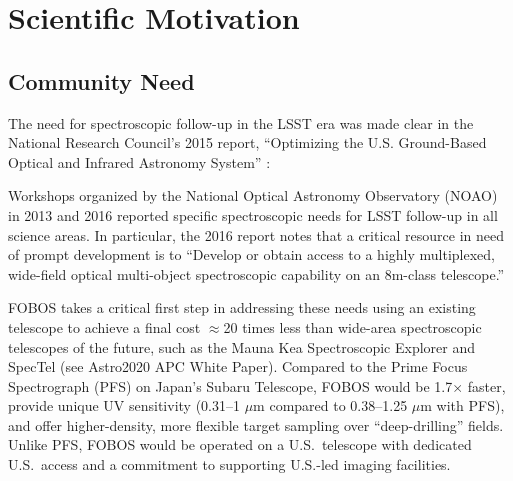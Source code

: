 
\vspace{-0.5cm}
\section{Scientific Motivation}

\subsection{Community Need} The need for spectroscopic follow-up in
the LSST era was made clear in the National Research Council's 2015
report, ``Optimizing the U.S. Ground-Based Optical and Infrared
Astronomy System'' \citep{NAP21722}:
%
\noindent{}

Workshops organized by the National Optical Astronomy Observatory
(NOAO) in 2013 and 2016 reported specific spectroscopic needs for
LSST follow-up in all science areas. In particular, the 2016 report
notes that a critical resource in need of prompt development is to
``Develop or obtain access to a highly multiplexed, wide-field
optical multi-object spectroscopic capability on an 8m-class
telescope.''

FOBOS takes a critical first step in addressing these needs using an
existing telescope to achieve a final cost $\approx$20 times less
than wide-area spectroscopic telescopes of the future, such as the
Mauna Kea Spectroscopic Explorer \citep[MSE,][]{mse2018} and SpecTel
(see Astro2020 APC White Paper). Compared to the Prime Focus
Spectrograph (PFS) on Japan's Subaru Telescope, FOBOS would be
1.7$\times$ faster, provide unique UV sensitivity (0.31--1 $\mu$m
compared to 0.38--1.25 $\mu$m with PFS), and offer higher-density,
more flexible target sampling over ``deep-drilling'' fields. Unlike
PFS, FOBOS would be operated on a U.S.\ telescope with dedicated
U.S.\ access and a commitment to supporting U.S.-led imaging
facilities.

